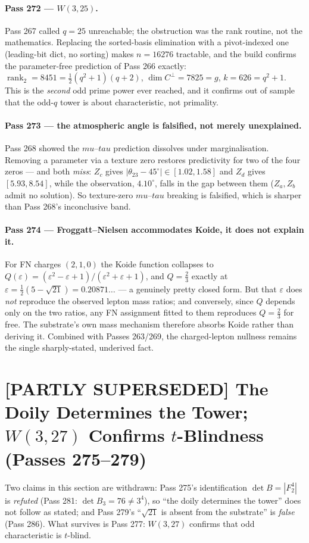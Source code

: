 \documentclass[12pt,a4paper]{article}
\def\mathbf#1{#1}%
\def\textbf#1{#1}%
\def\mu{mu}%
\def\tau{tau}%
\theoremstyle{definition}
\begin{document}
\paragraph{Pass 272 --- $W(3,25)$.} Pass 267 called $q=25$ unreachable; the
obstruction was the rank routine, not the mathematics. Replacing the sorted-basis
elimination with a pivot-indexed one (leading-bit dict, no sorting) makes
$n=16276$ tractable, and the build confirms the parameter-free prediction of
Pass 266 exactly:
$\operatorname{rank}_2=\mathbf{8451}=\tfrac12(q^2+1)(q+2)$, $\dim C^{\perp}=7825=g$,
$k=626=q^2+1$. This is the \emph{second} odd prime power ever reached, and it
confirms out of sample that the odd-$q$ tower is about characteristic, not
primality.

\paragraph{Pass 273 --- the atmospheric angle is falsified, not merely
unexplained.} Pass 268 showed the $\mu$--$\tau$ prediction dissolves under
marginalisation. Removing a parameter via a texture zero restores predictivity
for two of the four zeros --- and both \emph{miss}: $Z_c$ gives
$|\theta_{23}-45^\circ|\in[1.02,1.58]$ and $Z_d$ gives $[5.93,8.54]$, while the
observation, $4.10^\circ$, falls in the gap between them ($Z_a,Z_b$ admit no
solution). So texture-zero $\mu$--$\tau$ breaking is falsified, which is sharper
than Pass 268's inconclusive band.

\paragraph{Pass 274 --- Froggatt--Nielsen accommodates Koide, it does not explain
it.} For FN charges $(2,1,0)$ the Koide function collapses to
$Q(\varepsilon)=(\varepsilon^2-\varepsilon+1)/(\varepsilon^2+\varepsilon+1)$, and
$Q=\tfrac23$ exactly at $\varepsilon=\tfrac12(5-\sqrt{21})=0.20871\ldots$ --- a
genuinely pretty closed form. But that $\varepsilon$ does \emph{not} reproduce the
observed lepton mass ratios; and conversely, since $Q$ depends only on the two
ratios, any FN assignment fitted to them reproduces $Q=\tfrac23$ for free. The
substrate's own mass mechanism therefore absorbs Koide rather than deriving it.
Combined with Passes 263/269, the charged-lepton nullness remains the single
sharply-stated, underived fact.


\section{[PARTLY SUPERSEDED] The Doily Determines the Tower; $W(3,27)$ Confirms $t$-Blindness (Passes 275--279)}
\noindent\textbf{[SUPERSEDED --- see Errata.]} Two claims in this section are withdrawn: Pass 275's identification $\det B=|\mathbf F_2^4|$ is \emph{refuted} (Pass 281: $\det B_3=76\neq 3^4$), so ``the doily determines the tower'' does not follow as stated; and Pass 279's ``$\sqrt{21}$ is absent from the substrate'' is \emph{false} (Pass 286). What survives is Pass 277: $W(3,27)$ confirms that odd characteristic is $t$-blind.
\end{document}

